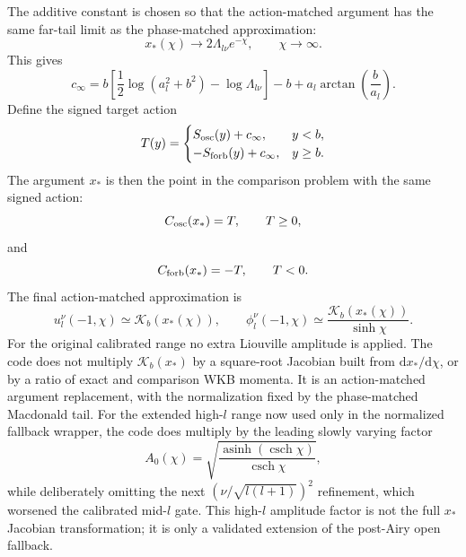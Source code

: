 \documentclass[11pt,a4paper]{article}
\newcommand{\dd}{\mathrm{d}}
\newcommand{\asinh}{\operatorname{asinh}}
\newcommand{\cosech}{\operatorname{csch}}
\begin{document}
The additive constant is chosen so that the action-matched argument has the
same far-tail limit as the phase-matched approximation:
\begin{equation}
  x_*(\chi)\longrightarrow 2\Lambda_{l\nu}e^{-\chi},
  \qquad \chi\to\infty.
\end{equation}
This gives
\begin{equation}
  c_\infty=
  b\left[\frac12\log(a_l^2+b^2)-\log\Lambda_{l\nu}\right]
  -b+a_l\arctan\!\left(\frac{b}{a_l}\right).
  \label{eq:app-smallnu-cphase}
\end{equation}
Define the signed target action
\begin{equation}
  T(y)=
  \begin{cases}
  S_{\rm osc}(y)+c_\infty, & y<b,\\
  -S_{\rm forb}(y)+c_\infty, & y\ge b.
  \end{cases}
  \label{eq:app-smallnu-target}
\end{equation}
The argument \(x_*\) is then the point in the comparison problem with the same
signed action:
\begin{equation}
  C_{\rm osc}(x_*)=T,\qquad T\ge0,
  \label{eq:app-smallnu-xstar-osc}
\end{equation}
and
\begin{equation}
  C_{\rm forb}(x_*)=-T,\qquad T<0.
  \label{eq:app-smallnu-xstar-forb}
\end{equation}
The final action-matched approximation is
\begin{equation}
  u_l^\nu(-1,\chi)\simeq \mathcal K_b(x_*(\chi)),\qquad
  \phi_l^\nu(-1,\chi)\simeq \frac{\mathcal K_b(x_*(\chi))}{\sinh\chi}.
  \label{eq:app-smallnu-action-result}
\end{equation}
For the original calibrated range no extra Liouville amplitude is applied.  The
code does not multiply \(\mathcal K_b(x_*)\) by a square-root Jacobian built
from \(\dd x_*/\dd\chi\), or by a ratio of exact and comparison WKB momenta.
It is an action-matched argument replacement, with the normalization fixed by
the phase-matched Macdonald tail.  For the extended high-\(l\) range now used
only in the normalized fallback wrapper, the code does multiply by the leading
slowly varying factor
\begin{equation}
  A_0(\chi)=
  \sqrt{\frac{\asinh(\cosech\chi)}{\cosech\chi}},
  \label{eq:app-smallnu-A0}
\end{equation}
while deliberately omitting the next \((\nu/\sqrt{l(l+1)})^2\) refinement,
which worsened the calibrated mid-\(l\) gate.  This high-\(l\) amplitude factor
is not the full \(x_*\) Jacobian transformation; it is only a validated
extension of the post-Airy open fallback.
\end{document}
